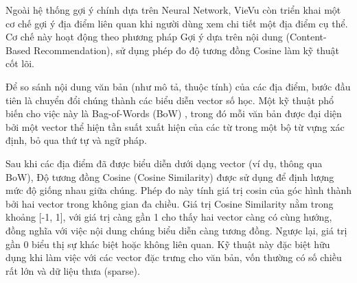 
Ngoài hệ thống gợi ý chính dựa trên Neural Network, VieVu còn triển khai một cơ chế gợi ý địa điểm liên quan khi người dùng xem chi tiết một địa điểm cụ thể. Cơ chế này hoạt động theo phương pháp Gợi ý dựa trên nội dung (Content-Based Recommendation), sử dụng phép đo độ tương đồng Cosine làm kỹ thuật cốt lõi.

Để so sánh nội dung văn bản (như mô tả, thuộc tính) của các địa điểm, bước đầu tiên là chuyển đổi chúng thành các biểu diễn vector số học. Một kỹ thuật phổ biến cho việc này là Bag-of-Words (BoW) \cite{bow_concept}, trong đó mỗi văn bản được đại diện bởi một vector thể hiện tần suất xuất hiện của các từ trong một bộ từ vựng xác định, bỏ qua thứ tự và ngữ pháp.

Sau khi các địa điểm đã được biểu diễn dưới dạng vector (ví dụ, thông qua BoW), Độ tương đồng Cosine (Cosine Similarity) \cite{cosine_similarity_concept} được sử dụng để định lượng mức độ giống nhau giữa chúng. Phép đo này tính giá trị cosin của góc hình thành bởi hai vector trong không gian đa chiều. Giá trị Cosine Similarity nằm trong khoảng [-1, 1], với giá trị càng gần 1 cho thấy hai vector càng có cùng hướng, đồng nghĩa với việc nội dung chúng biểu diễn càng tương đồng. Ngược lại, giá trị gần 0 biểu thị sự khác biệt hoặc không liên quan. Kỹ thuật này đặc biệt hữu dụng khi làm việc với các vector đặc trưng cho văn bản, vốn thường có số chiều rất lớn và dữ liệu thưa (sparse).

